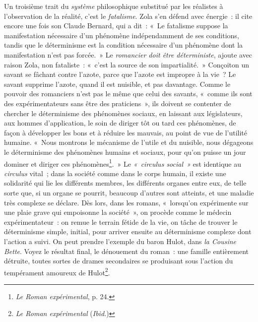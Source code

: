 \documentclass[french,twoside]{book} %
\begin{document}
Un troisième trait du \emph{système} philosophique substitué par les réalistes à l’observation de la réalité, c’est le \emph{fatalisme}. Zola s’en défend avec énergie : il cite encore une fois son Claude Bernard, qui a dit : « Le fatalisme suppose la manifestation nécessaire d’un phénomène indépendamment de ses conditions, tandis que le déterminisme est la condition nécessaire d’un phénomène dont la manifestation n’est pas forcée. » Le \emph{romancier doit être déterministe}, ajoute avec raison Zola, non fataliste : « c’est la source de son impartialité. » Conçoiton un savant se fâchant contre l’azote, parce que l’azote est impropre à la vie ? Le savant supprime l’azote, quand il est nuisible, et pas davantage. Comme le pouvoir des romanciers n’est pas le même que celui des savants, « comme ils sont des expérimentateurs sans être des praticiens », ils doivent se contenter de chercher le déterminisme des phénomènes sociaux, en laissant aux législateurs, aux hommes d’application, le soin de diriger tôt ou tard ces phénomènes, de façon à développer les bons et à réduire les mauvais, au point de vue de l’utilité humaine. « Nous montrons le mécanisme de l’utile et du nuisible, nous dégageons le déterminisme des phénomènes humains et sociaux, pour qu’on puisse un jour dominer et diriger ces phénomènes\footnote{\emph{Le Roman expérimental}, p. 24.}. » Le \emph{« circulus social »} est identique au \emph{circulus} vital ; dans la société comme dans le corps humain, il existe une solidarité qui lie les différents membres, les différents organes entre eux, de telle sorte que, si un organe se pourrit, beaucoup d’autres sont atteints, et une maladie très complexe se déclare. Dès lors, dans les romans, « lorsqu’on expérimente sur une plaie grave qui empoisonne la société », on procède comme le médecin expérimentateur : on remue le terrain fétide de la vie, on tâche de trouver le déterminisme simple, initial, pour arriver ensuite au déterminisme complexe dont l’action a suivi. On peut prendre l’exemple du baron Hulot, dans \emph{la Cousine Bette}. Voyez le résultat final, le dénouement du roman : une famille entièrement détruite, toutes sortes de drames secondaires se produisant sous l’action du tempérament amoureux de Hulot\footnote{\emph{Le Roman expérimental} (\emph{Ibid.})}.\par
\end{document}
